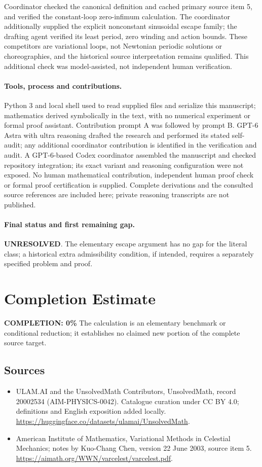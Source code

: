 \documentclass[11pt]{article}
\begin{document}
Coordinator checked the canonical definition and cached primary source item 5, and verified the constant-loop zero-infimum calculation. The coordinator additionally supplied the explicit nonconstant sinusoidal escape family; the drafting agent verified its least period, zero winding and action bounds. These competitors are variational loops, not Newtonian periodic solutions or choreographies, and the historical source interpretation remains qualified. This additional check was model-assisted, not independent human verification.

\paragraph{Tools, process and contributions.}
Python 3 and local shell used to read supplied files and serialize this manuscript; mathematics derived symbolically in the text, with no numerical experiment or formal proof assistant. Contribution prompt A was followed by prompt B. GPT-6 Astra with ultra reasoning drafted the research and performed its stated self-audit; any additional coordinator contribution is identified in the verification and audit. A GPT-6-based Codex coordinator assembled the manuscript and checked repository integration; its exact variant and reasoning configuration were not exposed. No human mathematical contribution, independent human proof check or formal proof certification is supplied. Complete derivations and the consulted source references are included here; private reasoning transcripts are not published.

\paragraph{Final status and first remaining gap.}
\textbf{UNRESOLVED}. The elementary escape argument has no gap for the literal class; a historical extra admissibility condition, if intended, requires a separately specified problem and proof.

\section{Completion Estimate}
\noindent\textbf{COMPLETION: 0\%}
The calculation is an elementary benchmark or conditional reduction; it establishes no claimed new portion of the complete source target.

\subsection{Sources}
\begin{itemize}
\item[\hypertarget{source:20002534:1}{S1}] ULAM.AI and the UnsolvedMath Contributors, UnsolvedMath, record 20002534 (AIM-PHYSICS-0042). Catalogue curation under CC BY 4.0; definitions and English exposition added locally.
\url{https://huggingface.co/datasets/ulamai/UnsolvedMath}.
\item[\hypertarget{source:20002534:2}{S2}] American Institute of Mathematics, Variational Methods in Celestial Mechanics; notes by Kuo-Chang Chen, version 22 June 2003, source item 5.
\url{https://aimath.org/WWN/varcelest/varcelest.pdf}.
\end{itemize}
\label{end:20002534}
\end{document}
